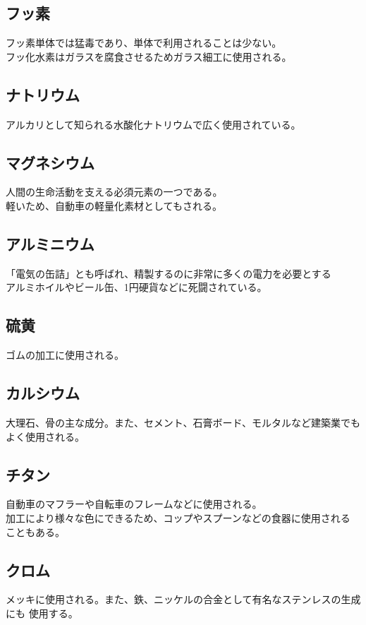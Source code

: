 \documentclass[dvipdfmx,autodetect-engine,titlepage]{jsarticle}
\begin{document}
\subsection{フッ素}
フッ素単体では猛毒であり、単体で利用されることは少ない。\\
フッ化水素はガラスを腐食させるためガラス細工に使用される。

\subsection{ナトリウム}
アルカリとして知られる水酸化ナトリウムで広く使用されている。

\subsection{マグネシウム}
人間の生命活動を支える必須元素の一つである。\\
軽いため、自動車の軽量化素材としてもされる。

\subsection{アルミニウム}
「電気の缶詰」とも呼ばれ、精製するのに非常に多くの電力を必要とする\\
アルミホイルやビール缶、1円硬貨などに死闘されている。

\subsection{硫黄}
ゴムの加工に使用される。

\subsection{カルシウム}
大理石、骨の主な成分。また、セメント、石膏ボード、モルタルなど建築業でも
よく使用される。

\subsection{チタン}
自動車のマフラーや自転車のフレームなどに使用される。\\
加工により様々な色にできるため、コップやスプーンなどの食器に使用される
こともある。

\subsection{クロム}
メッキに使用される。また、鉄、ニッケルの合金として有名なステンレスの生成にも
使用する。
\end{document}
